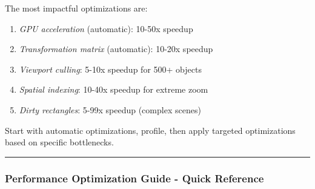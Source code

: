 \documentclass[11pt]{article}
\begin{document}
\begin{enumerate}
The most impactful optimizations are:
\begin{enumerate}
\item \emph{GPU acceleration} (automatic): 10-50x speedup
\item \emph{Transformation matrix} (automatic): 10-20x speedup
\item \emph{Viewport culling}: 5-10x speedup for 500+ objects
\item \emph{Spatial indexing}: 10-40x speedup for extreme zoom
\item \emph{Dirty rectangles}: 5-99x speedup (complex scenes)
\end{enumerate}

Start with automatic optimizations, profile, then apply targeted optimizations based on specific bottlenecks.


\noindent\rule{\textwidth}{0.5pt}
\end{enumerate}
\subsubsection{Performance Optimization Guide - Quick Reference}
\label{sec:org023a804}
\end{document}

